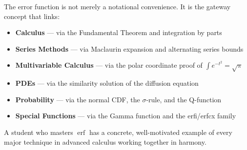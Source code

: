 \documentclass[11pt]{article}
\begin{document}
\begin{conceptbox}
The error function is not merely a notational convenience. It is the gateway concept that links:
\begin{itemize}[leftmargin=1.5em]
    \item \textbf{Calculus} --- via the Fundamental Theorem and integration by parts
    \item \textbf{Series Methods} --- via Maclaurin expansion and alternating series bounds
    \item \textbf{Multivariable Calculus} --- via the polar coordinate proof of $\int e^{-t^2}=\sqrt{\pi}$
    \item \textbf{PDEs} --- via the similarity solution of the diffusion equation
    \item \textbf{Probability} --- via the normal CDF, the $\sigma$-rule, and the Q-function
    \item \textbf{Special Functions} --- via the Gamma function and the erfi/erfcx family
\end{itemize}
A student who masters $\operatorname{erf}$ has a concrete, well-motivated example of every major technique in advanced calculus working together in harmony.
\end{conceptbox}
\end{document}
